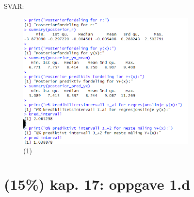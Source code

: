 \documentclass[12pt]{article}
\begin{document}
SVAR:
\begin{figure}[H]
  \centering
  \includegraphics[width=0.8\textwidth]{1.png}
  \caption{(1)}
\end{figure}

\section{(15\%) kap. 17: oppgave 1.d}
\end{document}
